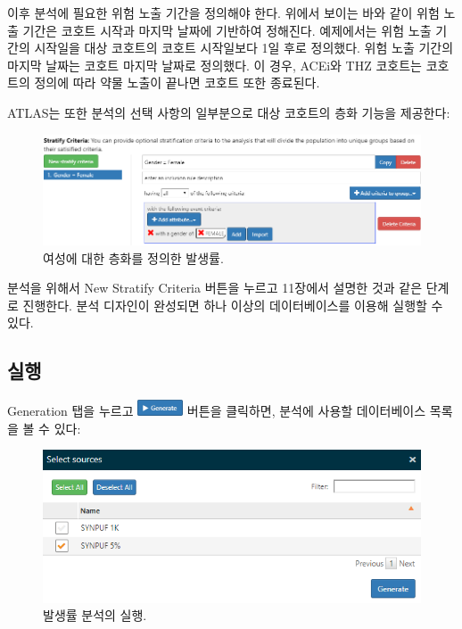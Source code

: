 \documentclass[11pt]{book}
\theoremstyle{definition}
\theoremstyle{definition}
\theoremstyle{definition}
\theoremstyle{remark}
\begin{document}
이후 분석에 필요한 위험 노출 기간을 정의해야 한다. 위에서 보이는 바와
같이 위험 노출 기간은 코호트 시작과 마지막 날짜에 기반하여 정해진다.
예제에서는 위험 노출 기간의 시작일을 대상 코호트의 코호트 시작일보다 1일
후로 정의했다. 위험 노출 기간의 마지막 날짜는 코호트 마지막 날짜로
정의했다. 이 경우, ACEi와 THZ 코호트는 코호트의 정의에 따라 약물 노출이
끝나면 코호트 또한 종료된다.

ATLAS는 또한 분석의 선택 사항의 일부분으로 대상 코호트의 층화 기능을
제공한다:

\begin{figure}

{\centering \includegraphics[width=1\linewidth]{images/Characterization/atlasIncidenceStratifyFemale} 

}

\caption{여성에 대한 층화를 정의한 발생률.}\label{fig:atlasIncidenceStratifyFemale}
\end{figure}

분석을 위해서 New Stratify Criteria 버튼을 누르고 11장에서 설명한 것과
같은 단계로 진행한다. 분석 디자인이 완성되면 하나 이상의 데이터베이스를
이용해 실행할 수 있다.

\subsection{실행}\label{-1}

Generation 탭을 누르고
\includegraphics{images/Characterization/atlasIncidenceGenerate.png}
버튼을 클릭하면, 분석에 사용할 데이터베이스 목록을 볼 수 있다:

\begin{figure}

{\centering \includegraphics[width=1\linewidth]{images/Characterization/atlasIncidenceSourceSelection} 

}

\caption{발생률 분석의 실행.}\label{fig:atlasIncidenceSourceSelection}
\end{figure}
\end{document}
